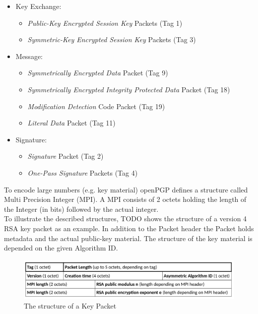 \begin{itemize}
	\item Key Exchange:
	\begin{itemize}
		\item \textit{Public-Key Encrypted Session Key} Packets (Tag 1)
		\item \textit{Symmetric-Key Encrypted Session Key} Packets (Tag 3)
	\end{itemize}
	
	\item Message:
	\begin{itemize}
		\item \textit{Symmetrically Encrypted Data} Packet (Tag 9)
		\item \textit{Symmetrically Encrypted Integrity Protected Data} Packet (Tag 18)
		\item \textit{Modification Detection} Code Packet (Tag 19)
		\item \textit{Literal Data} Packet (Tag 11)
	\end{itemize}
	
	\item Signature:
	\begin{itemize}
		\item \textit{Signature} Packet (Tag 2)
		\item \textit{One-Pass Signature} Packets (Tag 4)
	\end{itemize}
\end{itemize}

To encode large numbers (e.g. key material) openPGP defines a structure called Multi Precision Integer (MPI). A MPI consists of 2 octets holding the length of the Integer (in bits) followed by the actual integer. \\


To illustrate the described structures, TODO shows the structure of a version 4 RSA key packet as an example. In addition to the Packet header the Packet holds metadata and the actual public-key material. The structure of the key material is depended on the given Algorithm ID.

\begin{figure}[h!]
\centering
\includegraphics[width=1\linewidth]{figures/packet-key.png}
\caption[]{The structure of a Key Packet}
\label{fig:packet-key}
\end{figure}


